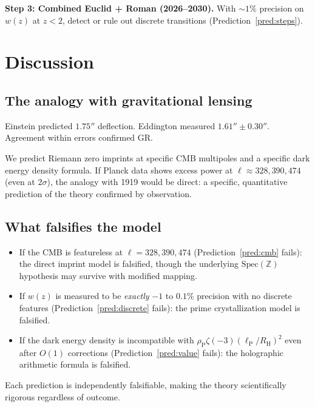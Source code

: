 \documentclass[11pt,a4paper]{article}
\newcommand{\Spec}{\mathrm{Spec}}
\newcommand{\lP}{\ell_{\mathrm{P}}}
\newcommand{\RH}{R_{\mathrm{H}}}
\newcommand{\rhoP}{\rho_{\mathrm{P}}}
\begin{document}
\textbf{Step 3: Combined Euclid + Roman (2026--2030).}
With $\sim 1\%$ precision on $w(z)$ at $z < 2$, detect or
rule out discrete transitions (Prediction~\ref{pred:steps}).

\section{Discussion}

\subsection{The analogy with gravitational lensing}

Einstein predicted $1.75''$ deflection. Eddington measured
$1.61'' \pm 0.30''$. Agreement within errors confirmed GR.

We predict Riemann zero imprints at specific CMB multipoles
and a specific dark energy density formula. If Planck data
shows excess power at $\ell \approx 328, 390, 474$ (even at
$2\sigma$), the analogy with 1919 would be direct: a specific,
quantitative prediction of the theory confirmed by observation.

\subsection{What falsifies the model}

\begin{itemize}
\item If the CMB is featureless at $\ell = 328, 390, 474$
  (Prediction~\ref{pred:cmb} fails): the direct imprint model
  is falsified, though the underlying $\Spec(\mathbb{Z})$
  hypothesis may survive with modified mapping.
\item If $w(z)$ is measured to be \emph{exactly} $-1$ to
  $0.1\%$ precision with no discrete features
  (Prediction~\ref{pred:discrete} fails): the prime
  crystallization model is falsified.
\item If the dark energy density is incompatible with
  $\rhoP \zeta(-3)(\lP/\RH)^2$ even after $O(1)$ corrections
  (Prediction~\ref{pred:value} fails): the holographic
  arithmetic formula is falsified.
\end{itemize}

Each prediction is independently falsifiable, making the
theory scientifically rigorous regardless of outcome.
\end{document}
